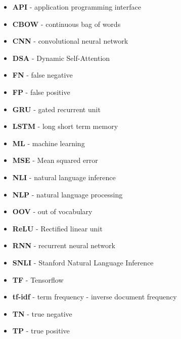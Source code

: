 \begin{itemize}
	\item[] \textbf{API} - application programming interface
	\item[] \textbf{CBOW} - continuous bag of words
	\item[] \textbf{CNN} - convolutional neural network
	\item[] \textbf{DSA} - Dynamic Self-Attention
	\item[] \textbf{FN} - false negative
	\item[] \textbf{FP} - false positive
	\item[] \textbf{GRU} - gated recurrent unit
	\item[] \textbf{LSTM} - long short term memory
	\item[] \textbf{ML} - machine learning
	\item[] \textbf{MSE} - Mean squared error
	\item[] \textbf{NLI} - natural language inference
	\item[] \textbf{NLP} - natural language processing
	\item[] \textbf{OOV} - out of vocabulary
	\item[] \textbf{ReLU} - Rectified linear unit
	\item[] \textbf{RNN} - recurrent neural network
	\item[] \textbf{SNLI} - Stanford Natural Language Inference
	\item[] \textbf{TF} - Tensorflow
	\item[] \textbf{tf-idf} - term frequency - inverse document frequency
	\item[] \textbf{TN} - true negative 
	\item[] \textbf{TP} - true positive 
\end{itemize}